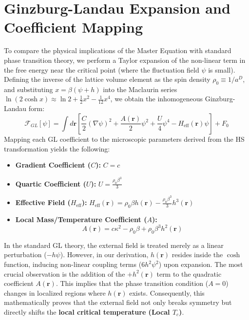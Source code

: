 \documentclass[12pt,a4paper]{article}
\begin{document}
\section{Ginzburg-Landau Expansion and Coefficient Mapping}
To compare the physical implications of the Master Equation with standard phase transition theory, we perform a Taylor expansion of the non-linear term in the free energy near the critical point (where the fluctuation field $\psi$ is small). Defining the inverse of the lattice volume element as the spin density $\rho_0 \equiv 1/a^D$, and substituting $x = \beta(\psi+h)$ into the Maclaurin series $\ln(2\cosh x) \approx \ln 2 + \frac{1}{2}x^2 - \frac{1}{12}x^4$, we obtain the inhomogeneous Ginzburg-Landau form:
\begin{equation}
    \mathcal{F}_{GL}[\psi] = \int d\mathbf{r} \left[ \frac{C}{2} (\nabla \psi)^2 + \frac{A(\mathbf{r})}{2} \psi^2 + \frac{U}{4} \psi^4 - H_{\text{eff}}(\mathbf{r}) \psi \right] + F_0
\end{equation}
Mapping each GL coefficient to the microscopic parameters derived from the HS transformation yields the following:
\begin{itemize}
    \item \textbf{Gradient Coefficient ($C$):} $C = c$ 
    \item \textbf{Quartic Coefficient ($U$):} $U = \frac{\rho_0 \beta^3}{3}$
    \item \textbf{Effective Field ($H_{\text{eff}}$):} $H_{\text{eff}}(\mathbf{r}) = \rho_0 \beta h(\mathbf{r}) - \frac{\rho_0 \beta^3}{3} h^3(\mathbf{r})$
    \item \textbf{Local Mass/Temperature Coefficient ($A$):}
    \begin{equation}
        A(\mathbf{r}) = c \kappa^2 - \rho_0 \beta + \rho_0 \beta^3 h^2(\mathbf{r})
    \end{equation}
\end{itemize}
In the standard GL theory, the external field is treated merely as a linear perturbation ($-h\psi$). However, in our derivation, $h(\mathbf{r})$ resides inside the $\cosh$ function, inducing non-linear coupling terms ($6h^2\psi^2$) upon expansion. The most crucial observation is the addition of the $+h^2(\mathbf{r})$ term to the quadratic coefficient $A(\mathbf{r})$. This implies that the phase transition condition ($A=0$) changes in localized regions where $h(\mathbf{r})$ exists. Consequently, this mathematically proves that the external field not only breaks symmetry but directly shifts the \textbf{local critical temperature (Local $T_c$)}.
\end{document}
